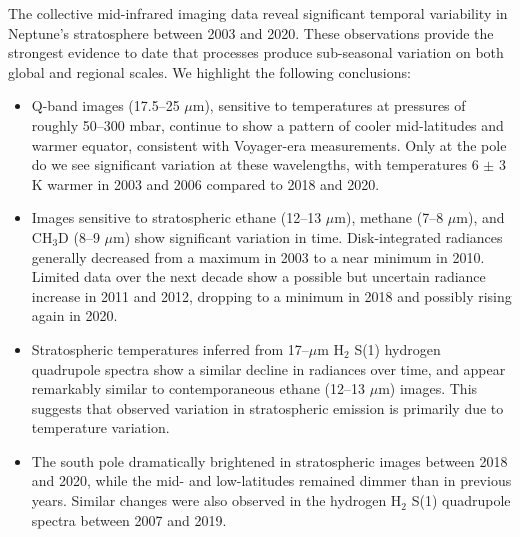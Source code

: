 \documentclass[twocolumn,10pt]{aastex631}
\begin{document}
The collective mid-infrared imaging data reveal significant temporal variability in Neptune's stratosphere between 2003 and 2020. These observations provide the strongest evidence to date that processes produce sub-seasonal variation on both global and regional scales. We highlight the following conclusions:
\begin{itemize}

  \item Q-band images (17.5--25 $\mu$m), sensitive to temperatures at pressures of roughly 50--300 mbar, continue to show a pattern of cooler mid-latitudes and warmer equator, consistent with Voyager-era measurements.  Only at the pole do we see significant variation at these wavelengths, with temperatures 6 $\pm$ 3 K warmer in 2003 and 2006 compared to 2018 and 2020. 

  \item Images sensitive to stratospheric ethane (12--13 $\mu$m), methane (7--8 $\mu$m), and CH$_3$D (8--9 $\mu$m) show significant variation in time.  Disk-integrated radiances generally decreased from a maximum in 2003 to a near minimum in 2010. Limited data over the next decade show a possible but uncertain radiance increase in 2011 and 2012, dropping to a minimum in 2018 and possibly rising again in 2020.   

  \item Stratospheric temperatures inferred from 17--$\mu$m H$_2$ S(1) hydrogen quadrupole spectra show a similar decline in radiances over time, and appear remarkably similar to contemporaneous ethane (12--13 $\mu$m) images.  This suggests that observed variation in stratospheric emission is primarily due to temperature variation. 
  

  \item The south pole dramatically brightened in stratospheric images between 2018 and 2020, while the mid- and low-latitudes remained dimmer than in previous years. Similar changes were also observed in the hydrogen H$_2$ S(1) quadrupole spectra between 2007 and 2019.   


\end{itemize}
\end{document}
